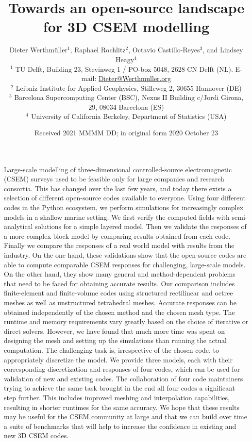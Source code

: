 \documentclass[extra, camera,%
]{gji}
\title[3D CSEM Open-Source Landscape]{Towards an open-source landscape for 3D CSEM modelling}
\author[D. Werthmüller \emph{et al.}]
  {\Large Dieter Werthmüller$^1$,  %
   Raphael Rochlitz$^2$,           %
   Octavio Castillo-Reyes$^3$, and %
   Lindsey Heagy$^4$\\             %
   \footnotesize
  $^1$ TU Delft, Building 23, Stevinweg 1 / PO-box 5048, 2628 CN Delft (NL).
  E-mail: \href{mailto:Dieter@Werthmuller.org}{Dieter@Werthmuller.org}\\[-.3em]
   \footnotesize
  $^2$ Leibniz Institute for Applied Geophysics, Stilleweg 2, 30655 Hannover (DE)\\[-.3em]
   \footnotesize
   $^3$ Barcelona Supercomputing Center (BSC), Nexus II Building c/Jordi Girona, 29, 08034 Barcelona (ES)\\[-.3em]
   \footnotesize
  $^4$ University of California Berkeley, Department of Statistics (USA)
  }
\date{Received 2021 MMMM DD; in original form 2020 October 23}
\makeatletter
\let\zz@tabular\@tabular
\let\zzendtabular\endtabular
\let\zz@xtabularcr\@xtabularcr
\let\zz@tabclassz\@tabclassz
\let\zz@tabclassiv \@tabclassiv
\let\zz@tabarray\@tabarray
\makeatother
\begin{document}
\label{firstpage}

{\makeatletter
\let\@tabular\zz@tabular
\let\endtabular\zzendtabular
\let\@xtabularcr\zz@xtabularcr
\let\@tabclassz\zz@tabclassz
\let\@tabclassiv \zz@tabclassiv 
\let\@tabarray\zz@tabarray
\maketitle
}

\begin{summary}
Large-scale modelling of three-dimensional controlled-source electromagnetic (CSEM) surveys used to be feasible only for large companies and research consortia. This has changed over the last few years, and today there exists a selection of different open-source codes available to everyone. Using four different codes in the Python ecosystem, we perform simulations for increasingly complex models in a shallow marine setting. We first verify the computed fields with semi-analytical solutions for a simple layered model. Then we validate the responses of a more complex block model by comparing results obtained from each code. Finally we compare the responses of a real world model with results from the industry. On the one hand, these validations show that the open-source codes are able to compute comparable CSEM responses for challenging, large-scale models. On the other hand, they show many general and method-dependent problems that need to be faced for obtaining accurate results. Our comparison includes finite-element and finite-volume codes using structured rectilinear and octree meshes as well as unstructured tetrahedral meshes. Accurate responses can be obtained independently of the chosen method and the chosen mesh type. The runtime and memory requirements vary greatly based on the choice of iterative or direct solvers. However, we have found that much more time was spent on designing the mesh and setting up the simulations than running the actual computation. The challenging task is, irrespective of the chosen code, to appropriately discretize the model. We provide three models, each with their corresponding discretization and responses of four codes, which can be used for validation of new and existing codes. The collaboration of four code maintainers trying to achieve the same task brought in the end all four codes a significant step further. This includes improved meshing and interpolation capabilities, resulting in shorter runtimes for the same accuracy. We hope that these results may be useful for the CSEM community at large and that we can build over time a suite of benchmarks that will help to increase the confidence in existing and new 3D CSEM codes.
\end{summary}
\end{document}
